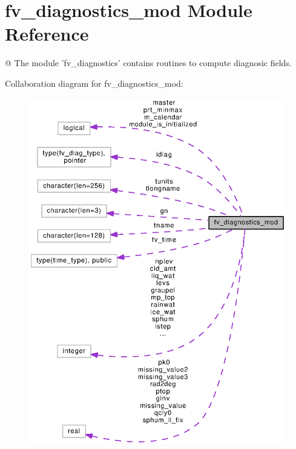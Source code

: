 \section{fv\-\_\-diagnostics\-\_\-mod Module Reference}
\label{classfv__diagnostics__mod}


@ The module 'fv\-\_\-diagnostics' contains routines to compute diagnosic fields.  




Collaboration diagram for fv\-\_\-diagnostics\-\_\-mod\-:
\nopagebreak
\begin{figure}[H]
\begin{center}
\leavevmode
\includegraphics[width=350pt]{classfv__diagnostics__mod__coll__graph}
\end{center}
\end{figure}
